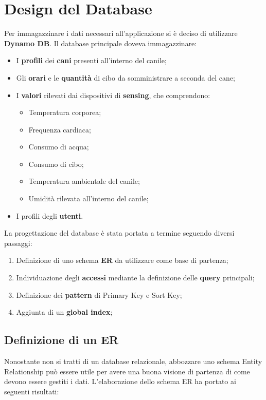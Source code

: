 \section{Design del Database}
Per immagazzinare i dati necessari all'applicazione si è deciso di utilizzare \textbf{Dynamo DB}.
Il database principale doveva immagazzinare:
\begin{itemize}
    \item I \textbf{profili} dei \textbf{cani} presenti all'interno del canile;
    \item Gli \textbf{orari} e le \textbf{quantità} di cibo da somministrare a seconda del cane;
    \item I \textbf{valori} rilevati dai dispositivi di \textbf{sensing}, che comprendono:
    \begin{itemize}
        \item Temperatura corporea;
        \item Frequenza cardiaca;
        \item Consumo di acqua; 
        \item Consumo di cibo;
        \item Temperatura ambientale del canile;
        \item Umidità rilevata all'interno del canile;
    \end{itemize}
    \item I profili degli \textbf{utenti}.
\end{itemize}

La progettazione del database è stata portata a termine seguendo diversi passaggi:
    \begin{enumerate}
        \item Definizione di uno schema \textbf{ER} da utilizzare come base di partenza;
        \item Individuazione degli \textbf{accessi} mediante la definizione delle \textbf{query} principali;
        \item Definizione dei \textbf{pattern} di Primary Key e Sort Key;
        \item Aggiunta di un \textbf{ global index};
    \end{enumerate}
    
    \subsection{Definizione di un ER}
    Nonostante non si tratti di un database relazionale, abbozzare uno schema Entity Relationship può essere utile per avere una buona visione di partenza di come devono essere gestiti i dati.
    L'elaborazione dello schema ER ha portato ai seguenti risultati:
 
